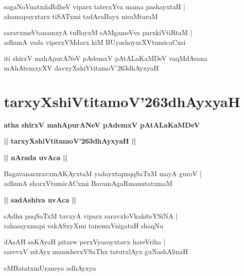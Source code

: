 \documentclass[twoside,12pt,openright]{book}
\def\S{\char'263}
\newcounter{shloka}[chapter]
\def\uvaca#1{\centerline{{\large\textbf{#1}}}}
\begin{document}
\begin{shloka}%
sagaNoVnatxdaRdheV viparx taterxYva mama pashayxtaH |\\
ahamapayxtarx tiSATxmi tadAraBayx niraMtaraM
\end{shloka}

\begin{shloka}%
saravxmeVtanamxyA tuBayxM sAMgameVva parxkiVtiRtaM |\\
adhunA vada viperxVMdarx kiM BUyashoyxrXVtumicaCxsi
\end{shloka}

\begin{center}
iti shirxV mahApurANeV pAdemxV pAtALaKaMDeV vaqMdAvana mAhAtemxyXV 
davxyXshiVtitamoV\S dhAyxyaH
\end{center}

\chapter{tarxyXshiVtitamoV\S dhAyxyaH}

\begin{center}
{\LARGE\bfseries atha shirxV mahApurANeV pAdemxV pAtALaKaMDeV }
\end{center}

\begin{center}         
{\LARGE\bfseries || tarxyXshiVtitamoV\S dhAyxyaH ||}
\end{center}

\uvaca{|| nArada uvAca ||}

\begin{shloka}%
BagavanasxravxmAKAyxtaM yadayxtapxqqSaTxM mayA guroV |\\
adhunA shorxVtumicACxmi BavamAgaRmanutatxmaM 
\end{shloka}

\uvaca{|| sadAshiva uvAca ||}

\begin{shloka}%
sAdhu paqSaTxM tavxyA viparx saravxloVkahiteYSiNA |\\
rahasayxmapi vakASxyXmi tanemxVnigataH shaqNu
\end{shloka}

\begin{shloka}%
dAsAH saKAyaH pitarw perxVyasayxtavx hareVriha |\\
sarevxV nitAyx munisherxVSaThx tatutxlAyx guNashAlinaH
\end{shloka}

\begin{center}
eMBatatxmUraneya adhAyxya 
\end{center}
\end{document}
